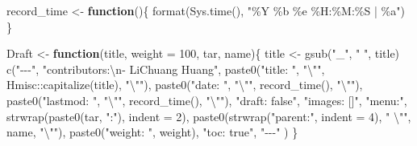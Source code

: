 \documentclass[
]{article}
\newenvironment{Shaded}{\begin{snugshade}}{\end{snugshade}}
\newcommand{\AttributeTok}[1]{\textcolor[rgb]{0.77,0.63,0.00}{#1}}
\newcommand{\ControlFlowTok}[1]{\textcolor[rgb]{0.13,0.29,0.53}{\textbf{#1}}}
\newcommand{\DecValTok}[1]{\textcolor[rgb]{0.00,0.00,0.81}{#1}}
\newcommand{\FunctionTok}[1]{\textcolor[rgb]{0.00,0.00,0.00}{#1}}
\newcommand{\NormalTok}[1]{#1}
\newcommand{\OtherTok}[1]{\textcolor[rgb]{0.56,0.35,0.01}{#1}}
\newcommand{\SpecialCharTok}[1]{\textcolor[rgb]{0.00,0.00,0.00}{#1}}
\newcommand{\StringTok}[1]{\textcolor[rgb]{0.31,0.60,0.02}{#1}}
\begin{document}
\begin{Shaded}
\begin{Highlighting}[]
\NormalTok{record\_time }\OtherTok{\textless{}{-}} \ControlFlowTok{function}\NormalTok{()\{}
  \FunctionTok{format}\NormalTok{(}\FunctionTok{Sys.time}\NormalTok{(), }\StringTok{"\%Y \%b \%e \%H:\%M:\%S | \%a"}\NormalTok{)}
\NormalTok{\}}

\NormalTok{Draft }\OtherTok{\textless{}{-}} \ControlFlowTok{function}\NormalTok{(title, }\AttributeTok{weight =} \DecValTok{100}\NormalTok{, tar, name)\{}
\NormalTok{  title }\OtherTok{\textless{}{-}} \FunctionTok{gsub}\NormalTok{(}\StringTok{"\_"}\NormalTok{, }\StringTok{" "}\NormalTok{, title)}
  \FunctionTok{c}\NormalTok{(}\StringTok{"{-}{-}{-}"}\NormalTok{,}
    \StringTok{"contributors:}\SpecialCharTok{\textbackslash{}n}\StringTok{{-} LiChuang Huang"}\NormalTok{,}
    \FunctionTok{paste0}\NormalTok{(}\StringTok{"title: "}\NormalTok{, }\StringTok{"}\SpecialCharTok{\textbackslash{}"}\StringTok{"}\NormalTok{, Hmisc}\SpecialCharTok{::}\FunctionTok{capitalize}\NormalTok{(title), }\StringTok{"}\SpecialCharTok{\textbackslash{}"}\StringTok{"}\NormalTok{),}
    \FunctionTok{paste0}\NormalTok{(}\StringTok{"date: "}\NormalTok{, }\StringTok{"}\SpecialCharTok{\textbackslash{}"}\StringTok{"}\NormalTok{, }\FunctionTok{record\_time}\NormalTok{(), }\StringTok{"}\SpecialCharTok{\textbackslash{}"}\StringTok{"}\NormalTok{),}
    \FunctionTok{paste0}\NormalTok{(}\StringTok{"lastmod: "}\NormalTok{, }\StringTok{"}\SpecialCharTok{\textbackslash{}"}\StringTok{"}\NormalTok{, }\FunctionTok{record\_time}\NormalTok{(), }\StringTok{"}\SpecialCharTok{\textbackslash{}"}\StringTok{"}\NormalTok{),}
    \StringTok{"draft: false"}\NormalTok{,}
    \StringTok{"images: []"}\NormalTok{,}
    \StringTok{"menu:"}\NormalTok{,}
    \FunctionTok{strwrap}\NormalTok{(}\FunctionTok{paste0}\NormalTok{(tar, }\StringTok{":"}\NormalTok{), }\AttributeTok{indent =} \DecValTok{2}\NormalTok{),}
    \FunctionTok{paste0}\NormalTok{(}\FunctionTok{strwrap}\NormalTok{(}\StringTok{"parent:"}\NormalTok{, }\AttributeTok{indent =} \DecValTok{4}\NormalTok{), }\StringTok{" }\SpecialCharTok{\textbackslash{}"}\StringTok{"}\NormalTok{, name, }\StringTok{"}\SpecialCharTok{\textbackslash{}"}\StringTok{"}\NormalTok{),}
    \FunctionTok{paste0}\NormalTok{(}\StringTok{"weight: "}\NormalTok{, weight),}
    \StringTok{"toc: true"}\NormalTok{,}
    \StringTok{"{-}{-}{-}"}
\NormalTok{  )}
\NormalTok{\}}


\end{Highlighting}
\end{Shaded}
\end{document}
